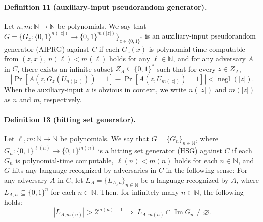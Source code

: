 \paragraph{Definition 11 (auxiliary-input pseudorandom generator).}
Let $n,m:\mathbb N\to\mathbb N$ be polynomials. We say that $G=\{G_z:\{0,1\}^{n(|z|)}\to\{0,1\}^{m(|z|)}\}_{z\in\{0,1\}^*}$ is an auxiliary-input pseudorandom generator (AIPRG) against $C$ if each $G_z(x)$ is polynomial-time computable from $(z,x)$, $n(\ell)<m(\ell)$ holds for any $\ell\in\mathbb N$, and for any adversary $A$ in $C$, there exists an infinite subset $Z_A\subseteq\{0,1\}^*$ such that for every $z\in Z_A$,
\[\left|\Pr[A(z,G_z(U_{n(|z|)}))=1]-\Pr[A(z,U_{m(|z|)})=1]\right|<\operatorname{negl}(|z|).\]
When the auxiliary-input $z$ is obvious in context, we write $n(|z|)$ and $m(|z|)$ as $n$ and $m$, respectively.
\paragraph{Definition 13 (hitting set generator).}
Let $\ell,m:\mathbb N\to\mathbb N$ be polynomials. We say that $G=\{G_n\}_{n\in\mathbb N}$, where $G_n:\{0,1\}^{\ell(n)}\to\{0,1\}^{m(n)}$ is a hitting set generator (HSG) against $C$ if each $G_n$ is polynomial-time computable, $\ell(n)<m(n)$ holds for each $n\in\mathbb N$, and $G$ hits any language recognized by adversaries in $C$ in the following sense: For any adversary $A$ in $C$, let $L_A=\{L_{A,n}\}_{n\in\mathbb N}$ be a language recognized by $A$, where $L_{A,n}\subseteq\{0,1\}^n$ for each $n\in\mathbb N$. Then, for infinitely many $n\in\mathbb N$, the following holds:
\[|L_{A,m(n)}|>2^{m(n)-1}\ \Longrightarrow\ L_{A,m(n)}\cap\operatorname{Im}G_n\neq\varnothing.\]
